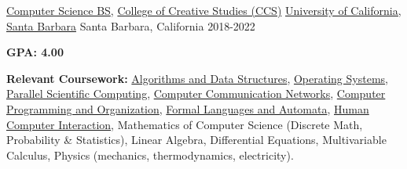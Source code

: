 
\begin{cventries}

  \cventry
	{\href{https://ccs.ucsb.edu/majors/computing}{Computer Science BS}, \href{https://ccs.ucsb.edu/}{College of Creative Studies (CCS)}} %
		{\href{https://www.ucsb.edu/}{University of California, Santa Barbara}} %
    {Santa Barbara, California} %
    {2018-2022} %
    {
    \begin{cvitems}
    \item \textbf{GPA: 4.00} 
		\item \textbf{Relevant Coursework:} \href{https://sites.cs.ucsb.edu/~suri/cs130a/cs130a.html}{Algorithms and Data Structures}, \href{https://sites.cs.ucsb.edu/~rich/class/cs170/}{Operating Systems}, \href{https://sites.cs.ucsb.edu/~tyang_class/140f19/}{Parallel Scientific Computing}, \href{https://cs.ucsb.edu/education/courses/cmpsc-176a}{Computer Communication Networks}, \href{https://ccs.ucsb.edu/courses/2019/winter/computer-programming-and-organization}{Computer Programming and Organization}, \href{https://cs.ucsb.edu/education/courses/cmpsc-138}{Formal Languages and Automata}, \href{https://cs.ucsb.edu/education/courses/cmpsc-185}{Human Computer Interaction}, Mathematics of Computer Science (Discrete Math, Probability \& Statistics), Linear Algebra, Differential Equations, Multivariable Calculus, Physics (mechanics, thermodynamics, electricity).
    \end{cvitems}
    }





\end{cventries}
